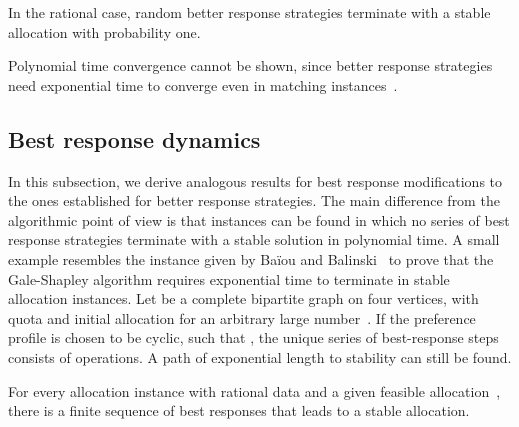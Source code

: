 \documentclass{llncs}
\begin{document}
\begin{theorem}
\label{th_random_better}
	In the rational case, random better response strategies terminate with a stable allocation with probability one.
\end{theorem}

Polynomial time convergence cannot be shown, since better response strategies need exponential time to converge even in matching instances~\cite{ackermann2011uncoordinated}.

\subsection{Best response dynamics}

In this subsection, we derive analogous results for best response modifications to the ones established for better response strategies. The main difference from the algorithmic point of view is that instances can be found in which no series of best response strategies terminate with a stable solution in polynomial time. A small example resembles the instance given by Ba\"iou and Balinski~\cite{DBLP:journals/mor/BaiouB02} to prove that the Gale-Shapley algorithm requires exponential time to terminate in stable allocation instances. Let  be a complete bipartite graph on four vertices, with quota  and initial allocation  for an arbitrary large number~. If the preference profile is chosen to be cyclic, such that , the unique series of best-response steps consists of  operations. A path of exponential length to stability can still be found. 


\begin{theorem}
\label{th:best_rat}
	For every allocation instance with rational data and a given feasible allocation~, there is a finite sequence of best responses that leads to a stable allocation.
\end{theorem}
\end{document}
